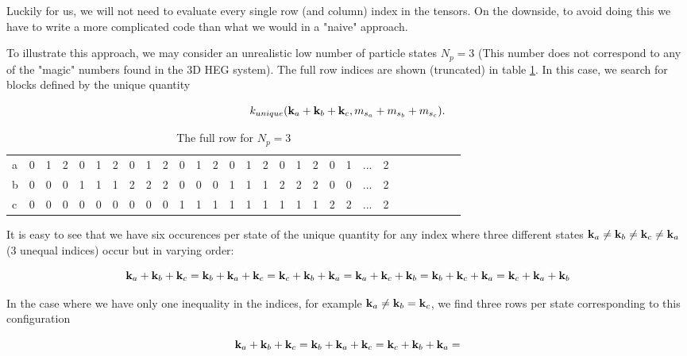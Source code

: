 Luckily for us, we will not need to evaluate every single row (and column) index in the tensors. On the downside, to avoid doing this we have to write a more complicated code than what we would in a "naive" approach. 

To illustrate this approach, we may consider an unrealistic low number of particle states $N_p = 3$ (This number does not correspond to any of the "magic" numbers found in the 3D HEG system). The full row indices are shown (truncated) in table \ref{tab:np3}. In this case, we search for blocks defined by the unique quantity

\begin{equation}
k_{unique}(\bold{k}_a + \bold{k}_b + \bold{k}_c, m_{s_a} + m_{s_b} +  m_{s_c}).
\end{equation}

\begin{table}[]
\centering
\caption{The full row for $N_p = 3$ }
\label{tab:np3}
\begin{tabular}{lllllllllllllllllllllllllllll}
a &0&  1&  2&  0&  1&  2&  0&  1&  2&  0&  1&  2&  0&  1&  2&  0&  1&  2& 0&  1& ... &  2& \\
b & 0&  0&  0&  1&  1&  1&  2&  2&  2&  0&  0&  0&  1&  1&  1&  2&  2&  2& 0&  0&  ... &  2& \\
c & 0&  0&  0&  0&  0&  0&  0&  0&  0&  1&  1&  1&  1&  1&  1&  1&  1&  1& 2&  2& ... &  2& \\
\end{tabular}
\end{table}

It is easy to see that we have six occurences per state of the unique quantity for any index where three different states $\bold{k}_a \neq \bold{k}_b \neq \bold{k}_c \neq \bold{k}_a$ (3 unequal indices) occur but in varying order:

\begin{equation}
\bold{k}_a + \bold{k}_b + \bold{k}_c = 
\bold{k}_b + \bold{k}_a + \bold{k}_c = 
\bold{k}_c + \bold{k}_b + \bold{k}_a = 
\bold{k}_a + \bold{k}_c + \bold{k}_b =
\bold{k}_b + \bold{k}_c + \bold{k}_a =
\bold{k}_c + \bold{k}_a + \bold{k}_b
\end{equation}

In the case where we have only one inequality in the indices, for example $\bold{k}_a \neq \bold{k}_b = \bold{k}_c$, we find three rows per state corresponding to this configuration

\begin{equation}
\bold{k}_a + \bold{k}_b + \bold{k}_c = 
\bold{k}_b + \bold{k}_a + \bold{k}_c = 
\bold{k}_c + \bold{k}_b + \bold{k}_a = 
\end{equation}


